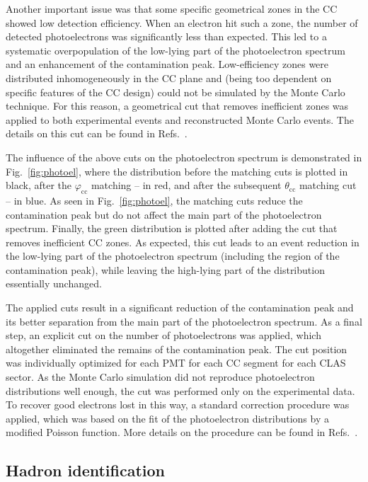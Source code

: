 \documentclass[prc,twocolumn,superscriptaddress,showpacs,amssymb,amsmath,amsfonts,aps,nofootinbib]{revtex4-1}
\begin{document}
Another important issue was that some specific geometrical zones in the CC showed low detection efficiency. When an electron hit such a zone, the number of detected photoelectrons was significantly less than expected. This led to a systematic overpopulation of the low-lying part of the photoelectron spectrum and an enhancement of the contamination peak. Low-efficiency zones were distributed inhomogeneously in the CC plane and (being too dependent on specific features of the CC design) could not be simulated by the Monte Carlo technique. For this reason, a geometrical cut that removes inefficient zones was applied to both experimental events and reconstructed Monte Carlo events. The details on this cut can be found in Refs.\!~\cite{my_an_note:2020, my_thesis:2021,Fed_an_note:2017,Fed_paper_2018}.


The influence of the above cuts on the photoelectron spectrum is demonstrated in Fig.\!~\ref{fig:photoel}, where the distribution before the matching cuts is plotted in black, after the $\varphi_{\text{cc}}$ matching -- in red, and after the subsequent $\theta_{\text{cc}}$ matching cut -- in blue. As seen in Fig.\!~\ref{fig:photoel}, the matching cuts reduce the contamination peak but do not affect the main part of the photoelectron spectrum. Finally, the green distribution is plotted after adding the cut that removes inefficient CC zones. As expected, this cut leads to an event reduction in the low-lying part of the photoelectron spectrum (including the region of the contamination peak), while leaving the high-lying part of the distribution essentially unchanged.


The applied cuts result in a significant reduction of the contamination peak and its better separation from the main part of the photoelectron spectrum. As a final step, an explicit cut on the number of photoelectrons was applied, which altogether eliminated the remains of the contamination peak. The cut position was individually optimized for each PMT for each CC segment for each CLAS sector. As the Monte Carlo simulation did not reproduce photoelectron distributions well enough, the cut was performed only on the experimental data. To recover good electrons lost in this way, a standard correction procedure was applied, which was based on the fit of the photoelectron distributions by a modified Poisson function. More details on the procedure can be found in Refs.\!~\cite{my_an_note:2020, my_thesis:2021,Fed_an_note:2017,Fed_paper_2018}.


\subsection{Hadron identification}
\end{document}
